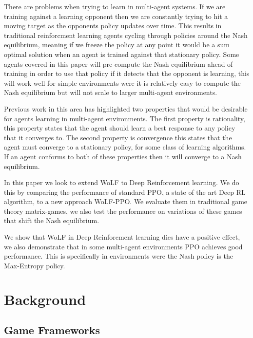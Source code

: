 \documentclass{article}
\begin{document}
There are problems when trying to learn in multi-agent systems. If we are training against a learning opponent then we are constantly trying to hit a moving target as the opponents policy updates over time. This results in traditional reinforcment learning agents cycling through policies around the Nash equilibrium, meaning if we freeze the policy at any point it would be a sum optimal solution when an agent is trained against that stationary policy. Some agents covered in this paper will pre-compute the Nash equilibrium ahead of training in order to use that policy if it detects that the opponent is learning, this will work well for simple environments were it is relatively easy to compute the Nash equilibrium but will not scale to larger multi-agent environments.

Previous work in this area has highlighted two properties that would be desirable for agents learning in multi-agent environments. The first property is rationality, this property states that the agent should learn a best response to any policy that it converges to. The second property is convergence this states that the agent must converge to a stationary policy, for some class of learning algorithms. If an agent conforms to both of these properties then it will converge to a Nash equilibrium.

In this paper we look to extend WoLF to Deep Reinforcement learning. We do this by comparing the performance of standard PPO, a state of the art Deep RL algorithm, to a new approach WoLF-PPO. We evaluate them in traditional game theory matrix-games, we also test the performance on variations of these games that shift the Nash equilibrium.

We show that WoLF in Deep Reinforcment learning dies have a positive effect, we also demonstrate that in some multi-agent environments PPO achieves good performance. This is specifically in environments were the Nash policy is the Max-Entropy policy.

\section{Background}

\subsection{Game Frameworks}
\end{document}
